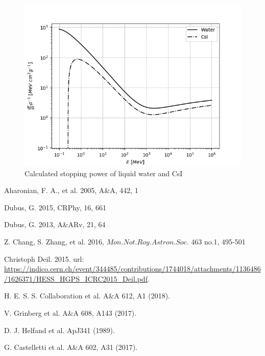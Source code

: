 \documentclass[11pt]{article}
\begin{document}
	\begin{figure}
		\centering
		\includegraphics[width=1.0\linewidth]{stopping}
		\caption{Calculated stopping power of liquid water and CsI}
		\label{fig:stopping}
	\end{figure}

	
	\begin{thebibliography}{99}
		Aharonian, F. A., et al. 2005, A\&A, 442, 1
		
		 Dubus, G. 2015, CRPhy, 16, 661
		
		 Dubus, G. 2013, A\&ARv, 21, 64
		
		 Z. Chang, S. Zhang, et al. 2016, $Mon.Not.Roy.Astron.Soc.$ 463 no.1, 495-501
		
		 Christoph Deil. 2015. url: \url{https://indico.cern.ch/event/344485/contributions/1744018/attachments/1136486/1626371/HESS_HGPS_ICRC2015_Deil.pdf}.
		
		 H. E. S. S. Collaboration et al. A\&A 612, A1 (2018).
		
		 V. Grinberg et al. A\&A 608, A143 (2017).
		
		 D. J. Helfand et al. ApJ341 (1989).
		
		 G. Castelletti et al. A\&A 602, A31 (2017).
		
	\end{thebibliography}
\end{document}
